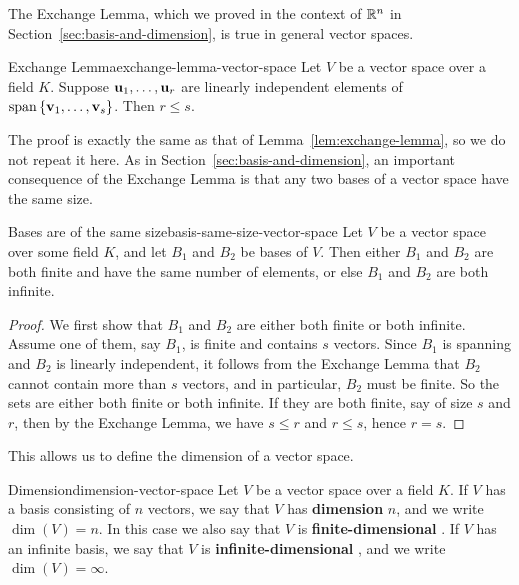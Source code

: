The Exchange Lemma, which we proved in the context of $\mathbb{R}^n$ in
Section~\ref{sec:basis-and-dimension}, is true in general vector
spaces.

\begin{lemma}{Exchange Lemma}{exchange-lemma-vector-space}
  Let $V$ be a vector space over a field $K$. Suppose
  $\vect{u}_1,\ldots,\vect{u}_r$ are linearly independent elements
  of $\sspan\set{\vect{v}_1,\ldots,\vect{v}_s}$. Then $r\leq s$.
\end{lemma}

The proof is exactly the same as that of
Lemma~\ref{lem:exchange-lemma}, so we do not repeat it here.  As in
Section~\ref{sec:basis-and-dimension}, an important consequence of the
Exchange Lemma is that any two bases of a vector space have the same
size.

\begin{theorem}{Bases are of the same size}{basis-same-size-vector-space}
  Let $V$ be a vector space over some field $K$, and let $B_1$ and
  $B_2$ be bases of $V$. Then either $B_1$ and $B_2$ are both finite
  and have the same number of elements, or else $B_1$ and $B_2$ are
  both infinite.
\end{theorem}

\begin{proof}
  We first show that $B_1$ and $B_2$ are either both finite or both
  infinite. Assume one of them, say $B_1$, is finite and contains $s$
  vectors. Since $B_1$ is spanning and $B_2$ is linearly independent,
  it follows from the Exchange Lemma that $B_2$ cannot contain more
  than $s$ vectors, and in particular, $B_2$ must be finite.  So the
  sets are either both finite or both infinite. If they are both
  finite, say of size $s$ and $r$, then by the Exchange Lemma, we have
  $s\leq r$ and $r\leq s$, hence $r=s$.
\end{proof}

This allows us to define the dimension of a vector space.

\begin{definition}{Dimension}{dimension-vector-space}
  Let $V$ be a vector space over a field $K$. If $V$ has a basis
  consisting of $n$ vectors, we say that $V$ has \textbf{dimension}%
   $n$, and we write $\dim(V)=n$. In
  this case we also say that $V$ is \textbf{finite-dimensional}%
  . If $V$ has an infinite
  basis, we say that $V$ is \textbf{infinite-dimensional}%
  , and we write
  $\dim(V) = \infty$.
\end{definition}


